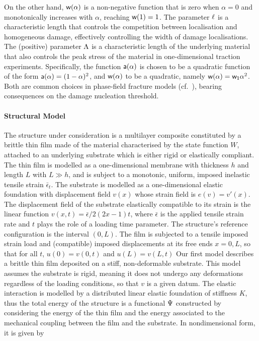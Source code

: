 On the other hand, $\mathsf{w}(\alpha)$ is a non-negative function that is zero when $\alpha=0$ and monotonically increases with $\alpha$, reaching $\mathsf{w}(1)=1$. The parameter $\ell$ is a characteristic length that controls the competition between localisation and homogeneous damage, effectively controlling the width of damage localisations. The (positive) parameter $\Lambda$ is a characteristic length of the underlying material that also controls the peak stress of the material in one-dimensional traction experiments.
Specifically, the function $\mathsf{a}(\alpha)$ is chosen to be a quadratic function of the form $\mathsf{a}(\alpha) = (1-\alpha)^2$, and $\mathsf{w}(\alpha)$ to be a quadratic, namely $\mathsf{w}(\alpha) = \mathsf{w_1}\alpha^2$. Both are common choices in phase-field fracture models (cf.~\cite{Bourdin2000-pc,Miehe2010-sj,Miehe2010-ja}), bearing consequences on the damage nucleation threshold.




\paragraph{Structural Model}
The structure under consideration is a multilayer composite constituted by a brittle thin film  made of the material characterised by the state function $W$, attached to an underlying substrate which is either rigid or elastically compliant. The thin film is modelled as a one-dimensional membrane with thickness $h$ and length $L$ with $L\gg h$, and is subject to a monotonic, uniform, imposed inelastic tensile strain $\bar\epsilon_t$. 
% 
The substrate is modelled as a one-dimensional elastic foundation with displacement field $v(x)$ whose strain field is $e(v) = v'(x)$. 
% 
The displacement field of the substrate elastically compatible to its strain is the linear function $v(x, t) = \bar\epsilon/2 (2x-1) t$, where $\bar\epsilon$ is the applied tensile strain rate and $t$ plays the role of a loading time parameter. 
% 
The structure's reference configuration is the interval $(0, L)$. The film is subjected to a tensile imposed strain load and (compatible) imposed displacements at its free ends $x = 0, L$, so that for all $t$, $u(0)=v(0, t)$ and $u(L)=v(L, t)$
% 
Our first model describes a brittle thin film deposited on a stiff, non-deformable substrate. This model assumes the substrate is rigid, meaning it does not undergo any deformations regardless of the loading conditions, so that $v$ is a given datum. The elastic interaction is modelled by a distributed linear elastic foundation of stiffness $K$, thus
the total energy of the structure is a functional $\Psi$ constructed by considering the energy of the thin film and the energy associated to the mechanical coupling between the film and the substrate. In nondimensional form, it is given by


